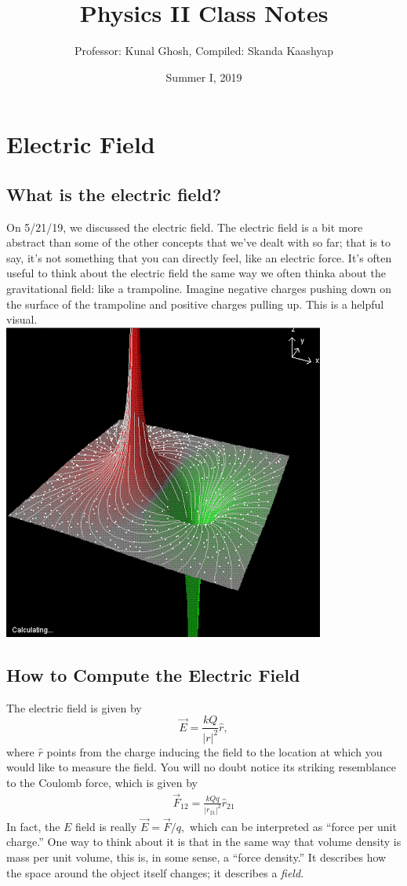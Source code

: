\documentclass[12pt]{extreport}
\title{Physics II Class Notes}
\author{Professor: Kunal Ghosh, Compiled: Skanda Kaashyap}
\date{Summer I, 2019}
\begin{document}
\maketitle
\chapter{Electric Field}
\section{What is the electric field?}
On 5/21/19, we discussed the electric field. The electric field is a bit more abstract than some of the other concepts that we've dealt with so far; that is to say, it's not something that you can directly feel, like an electric force. It's often useful to think about the electric field the same way we often thinka about the gravitational field: like a trampoline. Imagine negative charges pushing down on the surface of the trampoline and positive charges pulling up. This is a helpful visual.  \\

\includegraphics[]{efield.PNG}

\section{How to Compute the Electric Field}
 The electric field is given by $$\vec E = \frac{kQ}{|r|^2}\hat r,$$ where $\hat r$ points from the charge inducing the field to the location at which you would like to measure the field. You will no doubt notice its striking resemblance to the Coulomb force, which is given by 
	\begin{align}
		\vec F_{12} = \frac{k Q q}{|r_{21}|^2} \hat r_{21}
	\end{align}
In fact, the $E$ field is really $\vec{E} = \vec F/q,$ which can be interpreted as ``force per unit charge.'' One way to think about it is that in the same way that volume density is mass per unit volume, this is, in some sense, a ``force density.'' It describes how the space around the object itself changes; it describes a \textit{field.}
\end{document}
